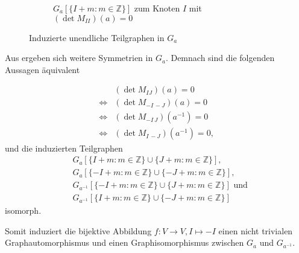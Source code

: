 \begin{figure}[]
\begin{subfigure}[b]{0.47\textwidth}
        \caption{${G_a[\{I+m:m\in \mathbb{Z}\}]}$ zum Knoten $I$ mit $(\det M_{II})(a) = 0$}
        \label{fig:complete-graph}
    \end{subfigure}
    \caption{Induzierte unendliche Teilgraphen in $G_a$}
    \label{fig:subgraphs}
\end{figure}

Aus  ergeben sich weitere Symmetrien in $G_a$. Demnach sind die folgenden Aussagen äquivalent

\begin{align*}
    &(\det{} M_{IJ})(a) = 0 \\
    \iff &(\det{} M_{-I\,-J})(a) = 0 \\
    \iff &(\det{} M_{-I\,J})(a^{-1}) = 0 \\
    \iff &(\det{} M_{I\,-J})(a^{-1}) = 0,
\end{align*}
und die induzierten Teilgraphen
\begin{align*}
    &G_a[\{I+m:m\in \mathbb{Z}\} \cup \{J+m:m\in \mathbb{Z}\}], \\
    &G_a[\{-I+m:m\in \mathbb{Z}\} \cup \{-J+m:m\in \mathbb{Z}\}], \\
    &G_{a^{-1}}[\{-I+m:m\in \mathbb{Z}\} \cup \{J+m:m\in \mathbb{Z}\}] \text{ und} \\
    &G_{a^{-1}}[\{I+m:m\in \mathbb{Z}\} \cup \{-J+m:m\in \mathbb{Z}\}]
\end{align*}
isomorph.

Somit induziert die bijektive Abbildung $f:V \to V, I \mapsto -I$ einen nicht trivialen Graphautomorphismus und einen Graphisomorphismus zwischen $G_a$ und $G_{a^{-1}}$.